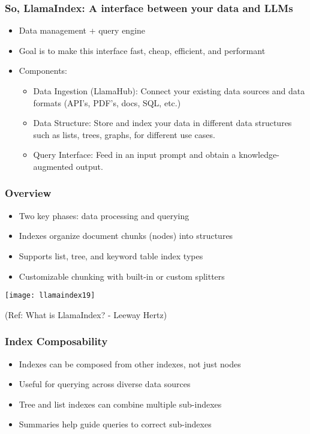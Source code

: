 \begin{frame}[fragile]\frametitle{So, LlamaIndex: A interface between your data and LLMs }


\begin{itemize}
\item Data management + query engine
\item Goal is to make this interface fast, cheap, efficient, and performant 
\item Components:
	\begin{itemize}
	\item Data Ingestion (LlamaHub): Connect your existing data sources and data formats (API’s, PDF’s, docs, SQL, etc.)
	\item Data Structure: Store and index your data in different data structures such as lists, trees, graphs, for different use cases. 
	\item Query Interface: Feed in an input prompt and obtain a knowledge-augmented output.
	\end{itemize}	

\end{itemize}	
\end{frame}

\begin{frame}[fragile]\frametitle{Overview}
    \begin{itemize}
        \item Two key phases: data processing and querying
        \item Indexes organize document chunks (nodes) into structures
        \item Supports list, tree, and keyword table index types
        \item Customizable chunking with built-in or custom splitters
    \end{itemize}

\begin{center}
\texttt{[image: llamaindex19]}

{\tiny (Ref: What is LlamaIndex? - Leeway Hertz)}
\end{center}
\end{frame}

\begin{frame}[fragile]\frametitle{Index Composability}
    \begin{itemize}
        \item Indexes can be composed from other indexes, not just nodes
        \item Useful for querying across diverse data sources
        \item Tree and list indexes can combine multiple sub-indexes
        \item Summaries help guide queries to correct sub-indexes
    \end{itemize}
\end{frame}

